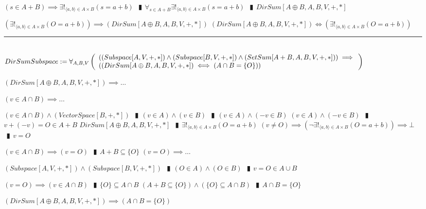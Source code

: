 \documentclass{book}
\newcommand{\abr}{:=}
\newcommand{\pipe}{$\phantom{(}\vrectangleblack\phantom{)}$}
\newcommand{\pr}[1]{\left(#1\right)}
\begin{document}
\begin{shaded}
\begin{enumerate}
\begin{enumerate}
\begin{enumerate}
    \end{enumerate}
    \lit $(s \in A + B) \implies \exists!_{\langle a, b \rangle \in A \times B}(s = a + b)$ \pipe $\forall_{s \in A + B} \exists!_{\langle a, b \rangle \in A \times B}(s = a + b)$ \pipe $DirSum[A \oplus B, A, B, V, +, *]$
  \end{enumerate}
  \lit $\pr{\exists!_{\langle a, b \rangle \in A \times B}(O = a + b)} \implies (DirSum[A \oplus B, A, B, V, +, *])$
  \lit $(DirSum[A \oplus B, A, B, V, +, *]) \iff \pr{\exists!_{\langle a, b \rangle \in A \times B}(O = a + b)}$
\end{enumerate} \vspace{.75mm} \hrule \vspace{.75mm} \ \\ 

$DirSumSubspace \abr \forall_{A, B, V}\left(\begin{array}{ll}
  \pr{(Subspace[A, V, +, *]) \land (Subspace[B, V, +, *]) \land (SetSum[A + B, A, B, V, +, *])} \hfill \implies \hfill \\
  \pr{(DirSum[A \oplus B, A, B, V, +, *]) \iff (A \cap B = \{O\})}
\end{array}\right)$
\begin{enumerate}
  \lit $(DirSum[A \oplus B, A, B, V, +, *]) \implies \ldots$
  \begin{enumerate}
    \lit $(v \in A \cap B) \implies \ldots$
    \begin{enumerate}
      \lit $(v \in A \cap B) \land (VectorSpace[B, +, *])$ \pipe $(v \in A) \land (v \in B)$ \pipe $(v \in A) \land (-v \in B)$
      \lit $(v \in A) \land (-v \in B)$ \pipe $v + (-v) = O \in A + B$
      \lit $DirSum[A \oplus B, A, B, V, +, *]$ \pipe $\exists!_{\langle a, b \rangle \in A \times B}(O = a + b)$
      \lit $(v \neq O) \implies \pr{\lnot \exists!_{\langle a, b \rangle \in A \times B}(O = a + b)} \implies \bot$ \pipe $v = O$
    \end{enumerate}
    \lit $(v \in A \cap B) \implies (v = O)$ \pipe $A + B \subseteq \{O\}$
    \lit $(v = O) \implies \ldots$
    \begin{enumerate}
      \lit $(Subspace[A, V, +, *]) \land (Subspace[B, V, +, *])$ \pipe $(O \in A) \land (O \in B)$ \pipe $v = O \in A \cup B$
    \end{enumerate}
    \lit $(v = O) \implies (v \in A \cap B)$ \pipe $\{O\} \subseteq A \cap B$
    \lit $(A + B \subseteq \{O\}) \land (\{O\} \subseteq A \cap B)$ \pipe $A \cap B = \{O\}$
  \end{enumerate}
  \lit $(DirSum[A \oplus B, A, B, V, +, *]) \implies (A \cap B = \{O\})$

\end{enumerate}
\end{shaded}
\end{document}
